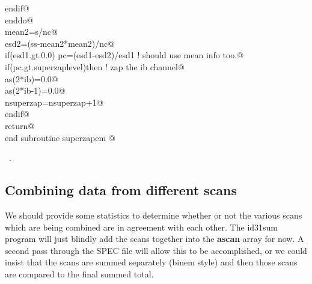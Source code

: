 \documentclass[10pt,a4paper,notitlepage]{article}
\newcommand{\var}[1]{\textbf{\textsf{#1}}} %
\begin{document}
\begin{flushleft}
\begin{minipage}{\linewidth}
\begin{list}{}{}
\mbox{}\verb@        endif@\\
\mbox{}\verb@      enddo@\\
\mbox{}\verb@      mean2=s/nc@\\
\mbox{}\verb@      esd2=(ss-mean2*mean2)/nc@\\
\mbox{}\verb@      if(esd1.gt.0.0) pc=(esd1-esd2)/esd1 ! should use mean info too.@\\
\mbox{}\verb@      if(pc.gt.superzaplevel)then ! zap the ib channel@\\
\mbox{}\verb@        as(2*ib)=0.0@\\
\mbox{}\verb@        as(2*ib-1)=0.0@\\
\mbox{}\verb@        nsuperzap=nsuperzap+1@\\
\mbox{}\verb@      endif@\\
\mbox{}\verb@      return@\\
\mbox{}\verb@      end subroutine superzapem                                            @{\NWsep}
\end{list}
\vspace{-1.5ex}
\footnotesize
\begin{list}{}{\setlength{\itemsep}{-\parsep}\setlength{\itemindent}{-\leftmargin}}
\item \NWtxtMacroRefIn\ .

\item{}
\end{list}
\end{minipage}\vspace{4ex}
\end{flushleft}
\subsection{Combining data from different scans}
We should provide some statistics to determine whether or not the various scans
which are being combined are in agreement with each other. The id31sum program
will just blindly add the scans together into the \var{ascan} array for
now. 
A second pass through the SPEC file will allow this to be accomplished, or
we could insist that the scans are summed separately (binem style) and then
those scans are compared to the final summed total. 
\end{document}
